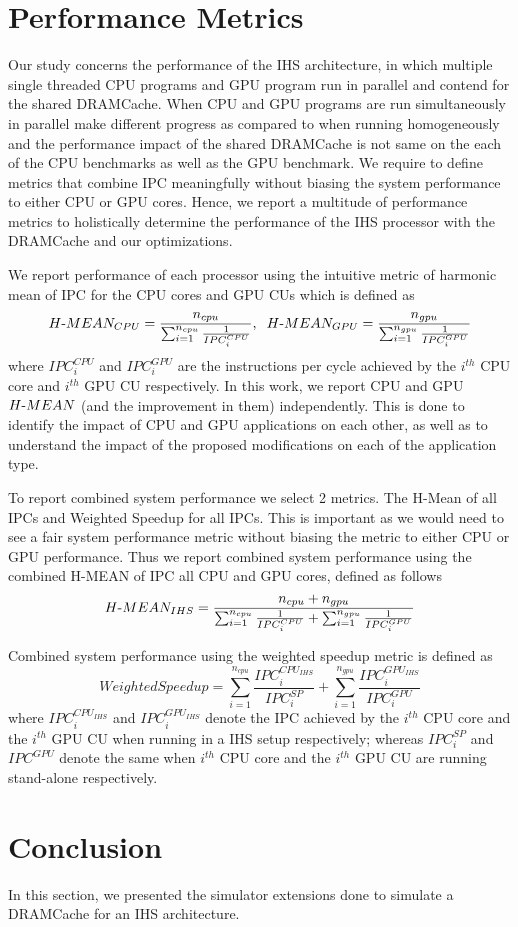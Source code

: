 \section{Performance Metrics} 
Our study concerns the performance of the IHS architecture, in which multiple single threaded CPU programs and GPU program run in parallel and contend for the shared DRAMCache. When CPU and GPU programs are run simultaneously in parallel make different progress as compared to when running homogeneously and the performance impact of the shared DRAMCache is not same on the each of the CPU benchmarks as well as the GPU benchmark. We require to define metrics that combine IPC meaningfully without biasing the system performance to either CPU or GPU cores. Hence, we report a multitude of performance metrics to holistically determine the performance of the IHS processor with the DRAMCache and our optimizations. 
\par We report performance of each processor using the intuitive metric of harmonic mean of IPC for the CPU cores and GPU CUs which is defined as 
{
\begin{equation*}
H\textnormal{-}MEAN_{CPU} = \frac{n_{cpu}}{\sum_{i=1}^{n_{cpu}} \frac{1}{IPC_{i}^{CPU}}}, \hspace{0.2cm} H\textnormal{-}MEAN_{GPU} = \frac{n_{gpu}}{\sum_{i=1}^{n_{gpu}} \frac{1}{IPC_{i}^{GPU}}} 
\end{equation*}
}
where $IPC_i^{CPU}$ and $IPC_i^{GPU}$ are the instructions per cycle achieved by the $i^{th}$ CPU core and $i^{th}$ GPU CU respectively.
In this work, we report CPU and GPU $H\textnormal{-}MEAN$ (and the improvement in them) independently. This is done to identify the impact of CPU and GPU applications on each other, as well as to understand the impact of the proposed modifications on each of the application type. 

\par To report combined system performance we select 2 metrics. The H-Mean of all IPCs and Weighted Speedup for all IPCs. This is important as we would need to see a fair system performance metric without biasing the metric to either CPU or GPU performance. Thus we report combined system performance using the combined H-MEAN of IPC all CPU and GPU cores, defined as follows
{
\begin{equation*}
H\textnormal{-}MEAN_{IHS} = \frac{n_{cpu}+ n_{gpu}}{\sum_{i=1}^{n_{cpu}} \frac{1}{IPC_{i}^{CPU}} + \sum_{i=1}^{n_{gpu}} \frac{1}{IPC_{i}^{GPU}}} 
\end{equation*}
}
\par Combined system performance using the weighted speedup metric \cite{weighted-speedup} is defined as
{
\begin{equation*}
Weighted Speedup = \sum_{i=1}^{n_{cpu}} \frac{IPC_i^{CPU_{IHS}}}{IPC_i^{SP}} + \sum_{i=1}^{n_{gpu}} \frac{IPC_i^{GPU_{IHS}}}{IPC_i^{GPU}}
\end{equation*}
}
where ${IPC_i^{CPU_{IHS}}}$ and $IPC_i^{GPU_{IHS}}$ denote the IPC achieved by the $i^{th}$ CPU core and the $i^{th}$ GPU CU when running in a IHS setup respectively; whereas $IPC_i^{SP}$ and $IPC^{GPU}$ denote the same when $i^{th}$ CPU core and the $i^{th}$ GPU CU are running stand-alone respectively. 

\section{Conclusion}
In this section, we presented the simulator extensions done to simulate a DRAMCache for an IHS architecture. 

